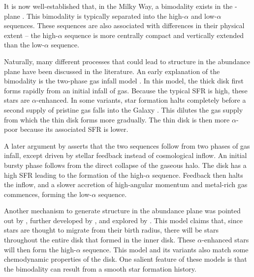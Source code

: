 It is now well-established that, in the Milky Way, a bimodality exists in the \alphaFe{}-\FeH{} plane \citep{1996ASPC...92..307G,1998A&A...338..161F,2004AN....325....3F,2006MNRAS.367.1329R,2011A&A...535L..11A,2012A&A...545A..32A,2014A&A...562A..71B,2014ApJ...796...38N,2020MNRAS.493.2952H}. This bimodality is typically separated into the high-$\alpha$ and low-$\alpha$ sequences. These sequences are also associated with differences in their physical extent -- the high-$\alpha$ sequence is more centrally compact and vertically extended than the low-$\alpha$ sequence.

Naturally, many different processes that could lead to structure in the abundance plane have been discussed in the literature. An early explanation of the bimodality is the two-phase gas infall model \citep{1997ApJ...477..765C,2009IAUS..254..191C,2017MNRAS.472.3637G,2019A&A...623A..60S}. In this model, the thick disk first forms rapidly from an initial infall of gas. Because the typical SFR is high, these stars are $\alpha$-enhanced. In some variants, star formation halts completely before a second supply of pristine gas falls into the Galaxy \citep[][and references therein]{2024arXiv240511025S}. This dilutes the gas supply from which the thin disk forms more gradually. The thin disk is then more $\alpha$-poor because its associated SFR is lower.

A later argument by \citet{2021MNRAS.501.5176K} asserts that the two sequences follow from two phases of gas infall, except driven by stellar feedback instead of cosmological inflow. An initial bursty phase follows from the direct collapse of the gaseous halo. The disk has a high SFR leading to the formation of the high-$\alpha$ sequence. Feedback then halts the inflow, and a slower accretion of high-angular momentum and metal-rich gas commences, forming the low-$\alpha$ sequence.

Another mechanism to generate structure in the abundance plane was pointed out by \citet{2009MNRAS.396..203S}, further developed by \citet{2021MNRAS.507.5882S,2023MNRAS.523.3791C}, and explored by \citet{2011ApJ...737....8L,2021MNRAS.508.4484J}. This model claims that, since stars are thought to migrate from their birth radius, there will be stars throughout the entire disk that formed in the inner disk. These $\alpha$-enhanced stars will then form the high-$\alpha$ sequence. This model and its variants also match some chemodynamic properties of the disk. One salient feature of these models is that the bimodality can result from a smooth star formation history.

